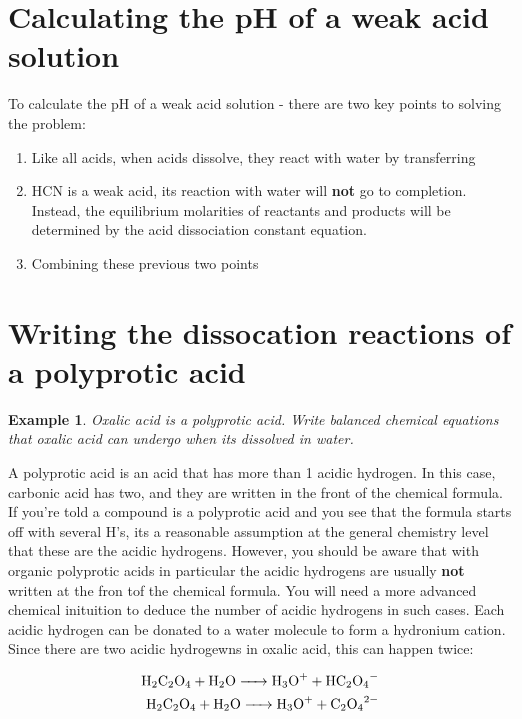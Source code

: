 \documentclass{article}  %
\newtheorem{exmp}{Example}
\begin{document}
\section*{Calculating the pH of a weak acid solution}
To calculate the pH of a weak acid solution - there are two key points to solving the problem: 
\begin{enumerate}
    \item Like all acids, when acids dissolve, they react with water by transferring  \\
    \item HCN is a weak acid, its reaction with water will \textbf{not} go to completion. Instead, the equilibrium molarities of reactants and products will be determined by the acid dissociation constant equation.
    \item Combining these previous two points 
\end{enumerate}

\section*{Writing the dissocation reactions of a polyprotic acid}
\begin{exmp}
    Oxalic acid  is a polyprotic acid. Write balanced chemical equations that oxalic acid can undergo when its dissolved in water. 
\end{exmp}
A polyprotic acid is an acid that has more than 1 acidic hydrogen. In this case, carbonic acid has two, and they are written in the front of the chemical formula.
\newline
If you're told a compound is a polyprotic acid and you see that the formula starts off with several H's, its a reasonable assumption at the general chemistry level that these are the acidic hydrogens.
\newline
However, you should be aware that with organic polyprotic acids in particular the acidic hydrogens are usually \textbf{not} written at the fron tof the chemical formula. You will need a more advanced chemical inituition to deduce the number of acidic hydrogens in such cases.
\newline
Each acidic hydrogen can be donated to a water molecule to form a hydronium cation. Since there are two acidic hydrogewns in oxalic acid, this can happen twice:

\begin{equation*}
    \begin{aligned}
        \ce{H2C2O4 + H2O -> H3O+ + HC2O4-} \\
        \ce{H2C2O4 + H2O -> H3O+ + C2O4^2-}
    \end{aligned}
\end{equation*}
\end{document}
